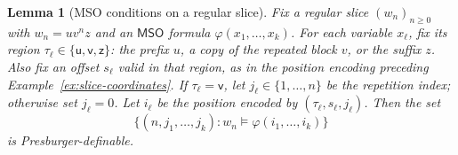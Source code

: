 \documentclass[11pt]{article}
\newtheorem{lemma}[theorem]{Lemma}
\theoremstyle{definition}
\newcommand{\MSO}{\mathsf{MSO}}
\begin{document}
\begin{lemma}[MSO conditions on a regular slice]
\label{lem:one-loop-finite-state}
Fix a regular slice $(w_n)_{n\ge0}$ with $w_n=uv^nz$ and an $\MSO$ formula
$\varphi(x_1,\ldots,x_k)$.  For each variable $x_\ell$, fix its region
$\tau_\ell\in\{\mathsf u,\mathsf v,\mathsf z\}$: the prefix $u$, a copy of the
repeated block $v$, or the suffix $z$.  Also fix an offset $s_\ell$ valid in
that region, as in the position encoding preceding
Example~\ref{ex:slice-coordinates}.  If $\tau_\ell=\mathsf v$, let
$j_\ell\in\{1,\ldots,n\}$ be the repetition index; otherwise set $j_\ell=0$.
Let $i_\ell$ be the position encoded by $(\tau_\ell,s_\ell,j_\ell)$.  Then the
set
\[
   \{(n,j_1,\ldots,j_k):
      w_n\models\varphi(i_1,\ldots,i_k)\}
\]
is Presburger-definable.
\end{lemma}
\end{document}
